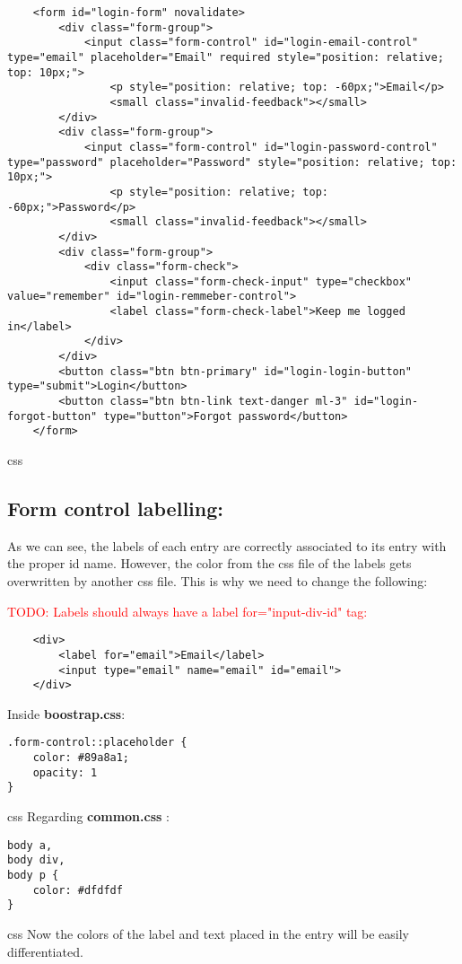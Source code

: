 \documentclass[a4paper,11pt]{article}
\newcommand\todo[1]{\textcolor{red}{TODO: #1}}
\theoremstyle{mytheor}
\begin{document}
\begin{verbatim}
    <form id="login-form" novalidate>
        <div class="form-group">
            <input class="form-control" id="login-email-control" type="email" placeholder="Email" required style="position: relative; top: 10px;">
                <p style="position: relative; top: -60px;">Email</p>
                <small class="invalid-feedback"></small>
        </div>
        <div class="form-group">
            <input class="form-control" id="login-password-control" type="password" placeholder="Password" style="position: relative; top: 10px;">
                <p style="position: relative; top: -60px;">Password</p>
                <small class="invalid-feedback"></small>
        </div>
        <div class="form-group">
            <div class="form-check">
                <input class="form-check-input" type="checkbox" value="remember" id="login-remmeber-control">
                <label class="form-check-label">Keep me logged in</label>
            </div>
        </div>
        <button class="btn btn-primary" id="login-login-button" type="submit">Login</button>
        <button class="btn btn-link text-danger ml-3" id="login-forgot-button" type="button">Forgot password</button>
    </form>
\end{verbatim}{css}
\subsection{{\textbf{Form control labelling}}:}
As we can see, the labels of each entry are correctly associated to its entry with the proper id name. However, the color from the css file of the labels gets overwritten by another css file. This is why we need to change the following:

\todo{Labels should always have a label for="input-div-id" tag: }

\begin{verbatim}
    <div>
        <label for="email">Email</label>
        <input type="email" name="email" id="email">
    </div>
\end{verbatim}

\newline
Inside {\textbf{boostrap.css}}:
\begin{verbatim}
.form-control::placeholder {
    color: #89a8a1;
    opacity: 1
}
\end{verbatim}{css}
Regarding {\textbf{common.css}} :
\begin{verbatim}
body a,
body div,
body p {
    color: #dfdfdf
}
\end{verbatim}{css}
Now the colors of the label and text placed in the entry will be easily differentiated. 
\newpage
\end{document}
